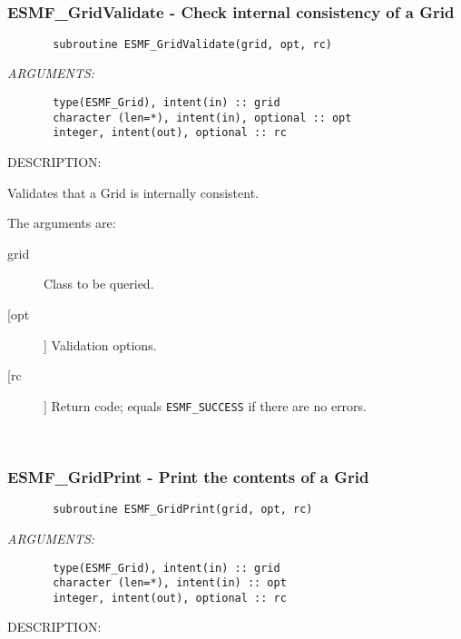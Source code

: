 {%
 
\mbox{}\hrulefill\ 
 
\subsubsection{ESMF\_GridValidate - Check internal consistency of a Grid}


 
\begin{verbatim}       subroutine ESMF_GridValidate(grid, opt, rc)\end{verbatim}{\em ARGUMENTS:}
\begin{verbatim}       type(ESMF_Grid), intent(in) :: grid       
       character (len=*), intent(in), optional :: opt    
       integer, intent(out), optional :: rc            \end{verbatim}
{\sf DESCRIPTION:\\ }


       Validates that a Grid is internally consistent.
  
       The arguments are:
       \begin{description}
       \item[grid] 
            Class to be queried.
       \item[[opt]]
            Validation options.
       \item[[rc]] 
            Return code; equals {\tt ESMF\_SUCCESS} if there are no errors.
       \end{description}
   
 
\mbox{}\hrulefill\ 
 
\subsubsection{ESMF\_GridPrint - Print the contents of a Grid}


 
\begin{verbatim}       subroutine ESMF_GridPrint(grid, opt, rc)\end{verbatim}{\em ARGUMENTS:}
\begin{verbatim}       type(ESMF_Grid), intent(in) :: grid      
       character (len=*), intent(in) :: opt      
       integer, intent(out), optional :: rc           \end{verbatim}
{\sf DESCRIPTION:\\ }


}
